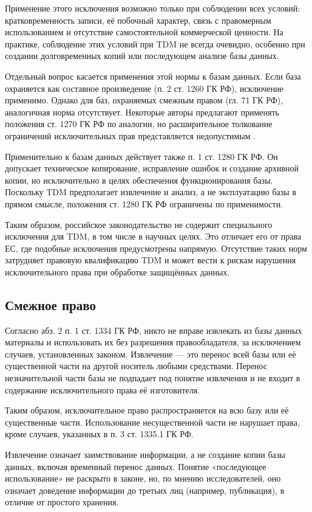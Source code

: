 Применение этого исключения возможно только при соблюдении всех условий:
кратковременность записи, её побочный характер, связь с правомерным
использованием и отсутствие самостоятельной коммерческой ценности. На практике,
соблюдение этих условий при TDM не всегда очевидно, особенно при создании
долговременных копий или последующем анализе базы данных.

Отдельный вопрос касается применения этой нормы к базам данных. Если база
охраняется как составное произведение (п. 2 ст. 1260 ГК РФ), исключение
применимо. Однако для баз, охраняемых смежным правом (гл. 71 ГК РФ),
аналогичная норма отсутствует. Некоторые авторы предлагают применять положения
ст. 1270 ГК РФ по аналогии, но расширительное толкование ограничений
исключительных прав представляется недопустимым \cite{sergeev2018}.

Применительно к базам данных действует также п. 1 ст. 1280 ГК РФ. Он допускает
техническое копирование, исправление ошибок и создание архивной копии, но
исключительно в целях обеспечения функционирования базы. Поскольку TDM
предполагает извлечение и анализ, а не эксплуатацию базы в прямом смысле,
положения ст. 1280 ГК РФ ограничены по применимости.

Таким образом, российское законодательство не содержит специального исключения
для TDM, в том числе в научных целях. Это отличает его от права ЕС, где
подобные исключения предусмотрены напрямую. Отсутствие таких норм затрудняет
правовую квалификацию TDM и может вести к рискам нарушения исключительного
права при обработке защищённых данных.

\subsection*{Смежное право}

Согласно абз. 2 п. 1 ст. 1334 ГК РФ, никто не вправе извлекать из базы данных
материалы и использовать их без разрешения правообладателя, за исключением
случаев, установленных законом. Извлечение — это перенос всей базы или её
существенной части на другой носитель любыми средствами. Перенос незначительной
части базы не подпадает под понятие извлечения и не входит в содержание
исключительного права её изготовителя.

Таким образом, исключительное право распространяется на всю базу или её
существенные части. Использование несущественной части не нарушает права, кроме
случаев, указанных в п. 3 ст. 1335.1 ГК РФ.

Извлечение означает заимствование информации, а не создание копии базы данных,
включая временный перенос данных. Понятие «последующее использование» не
раскрыто в законе, но, по мнению исследователей, оно означает доведение
информации до третьих лиц (например, публикация), в отличие от простого
хранения.

